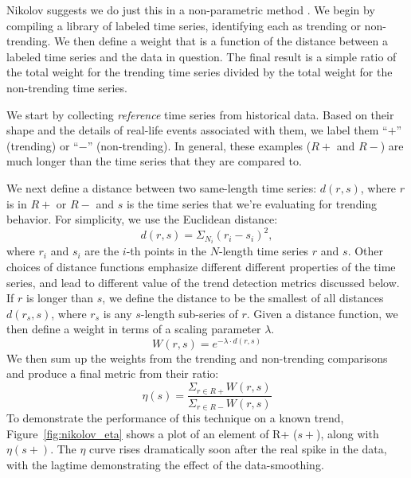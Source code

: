 \documentclass{article}
\begin{document}
Nikolov suggests we do just this in a non-parametric method \cite{Nikolov:2011}. We
begin by compiling a library of labeled time series, identifying each as
trending or non-trending. We then define a weight that is a function of the
distance between a labeled time series and the data in question. The final
result is a simple ratio of the total weight for the trending time series
divided by the total weight for the non-trending time series. 

We start by collecting \textit{reference} time series from historical data. Based on their
shape and the details of real-life events associated with them, we label
them “$+$” (trending) or “$-$” (non-trending). In general, these examples ($R+$
and $R-$) are much longer than the time series that they are compared to. 

We next define a distance between two same-length time series: $d(r,s)$,
where $r$ is in $R+$ or $R-$ and $s$ is the time series that we’re evaluating for
trending behavior. For simplicity, we use the Euclidean distance:
\begin{equation}
    d(r,s) = \Sigma_{N_i}(r_i - s_i)^2,
\end{equation}
where $r_i$ and $s_i$ are the $i$-th points in the $N$-length time series $r$ and $s$. Other
choices of distance functions emphasize different different properties of the
time series, and lead to different value of the trend detection metrics
discussed below. If $r$ is longer than $s$, we define the distance to be the
smallest of all distances $d(r_s,s)$, where $r_s$ is any $s$-length sub-series of $r$. Given
a distance function, we then define a weight in terms of a scaling
parameter $\lambda$. 
\begin{equation}
    W(r,s) = e^{-\lambda\cdot d(r,s)}
\end{equation}
We then sum up the weights from the trending and non-trending comparisons and
produce a final metric from their ratio:
\begin{equation}
    \eta(s) = \frac{\Sigma_{r\in R+}W(r,s)}{\Sigma_{r\in R-}W(r,s)} 
\end{equation}
To demonstrate the performance of this technique on a known trend,
Figure~\ref{fig:nikolov_eta} shows a plot of an element of R+ ($s+$), along with $\eta(s+)$.
The $\eta$ curve rises dramatically soon after the real spike in the
data, with the lagtime demonstrating the effect of the data-smoothing.
\end{document}
